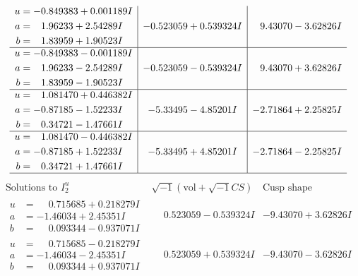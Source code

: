 \documentclass[1p]{elsarticle_modified}
\theoremstyle{definition}
\newcommand{\I}{\sqrt{-1}}
\begin{document}
$$\begin{array}{c|c|c}
\begin{aligned}
u &= -0.849383 + 0.001189 I \\
a &= \phantom{-}1.96233 + 2.54289 I \\
b &= \phantom{-}1.83959 + 1.90523 I\end{aligned}
 & -0.523059 + 0.539324 I & \phantom{-}9.43070 - 3.62826 I \\ \hline\begin{aligned}
u &= -0.849383 - 0.001189 I \\
a &= \phantom{-}1.96233 - 2.54289 I \\
b &= \phantom{-}1.83959 - 1.90523 I\end{aligned}
 & -0.523059 - 0.539324 I & \phantom{-}9.43070 + 3.62826 I \\ \hline\begin{aligned}
u &= \phantom{-}1.081470 + 0.446382 I \\
a &= -0.87185 - 1.52233 I \\
b &= \phantom{-}0.34721 - 1.47661 I\end{aligned}
 & -5.33495 - 4.85201 I & -2.71864 + 2.25825 I \\ \hline\begin{aligned}
u &= \phantom{-}1.081470 - 0.446382 I \\
a &= -0.87185 + 1.52233 I \\
b &= \phantom{-}0.34721 + 1.47661 I\end{aligned}
 & -5.33495 + 4.85201 I & -2.71864 - 2.25825 I\\
 \hline 
 \end{array}$$\newpage$$\begin{array}{c|c|c}  
\text{Solutions to }I^u_{2}& \I (\text{vol} + \sqrt{-1}CS) & \text{Cusp shape}\\
 \hline 
\begin{aligned}
u &= \phantom{-}0.715685 + 0.218279 I \\
a &= -1.46034 + 2.45351 I \\
b &= \phantom{-}0.093344 - 0.937071 I\end{aligned}
 & \phantom{-}0.523059 - 0.539324 I & -9.43070 + 3.62826 I \\ \hline\begin{aligned}
u &= \phantom{-}0.715685 - 0.218279 I \\
a &= -1.46034 - 2.45351 I \\
b &= \phantom{-}0.093344 + 0.937071 I\end{aligned}
 & \phantom{-}0.523059 + 0.539324 I & -9.43070 - 3.62826 I \\ \hline\begin{aligned}

\end{aligned}
\end{array}$$
\end{document}
